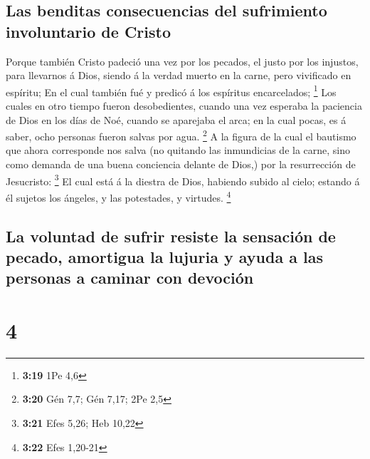 \hypertarget{las-benditas-consecuencias-del-sufrimiento-involuntario-de-cristo}{%
\subsection{Las benditas consecuencias del sufrimiento involuntario de
Cristo}\label{las-benditas-consecuencias-del-sufrimiento-involuntario-de-cristo}}

 Porque también Cristo padeció una vez por los pecados, el
justo por los injustos, para llevarnos á Dios, siendo á la verdad muerto
en la carne, pero vivificado en espíritu;  En el cual
también fué y predicó á los espíritus encarcelados; \footnote{\textbf{3:19}
  1Pe 4,6}  Los cuales en otro tiempo fueron desobedientes,
cuando una vez esperaba la paciencia de Dios en los días de Noé, cuando
se aparejaba el arca; en la cual pocas, es á saber, ocho personas fueron
salvas por agua. \footnote{\textbf{3:20} Gén 7,7; Gén 7,17; 2Pe 2,5}
 A la figura de la cual el bautismo que ahora corresponde
nos salva (no quitando las inmundicias de la carne, sino como demanda de
una buena conciencia delante de Dios,) por la resurrección de
Jesucristo: \footnote{\textbf{3:21} Efes 5,26; Heb 10,22} 
El cual está á la diestra de Dios, habiendo subido al cielo; estando á
él sujetos los ángeles, y las potestades, y virtudes. \footnote{\textbf{3:22}
  Efes 1,20-21}

\hypertarget{la-voluntad-de-sufrir-resiste-la-sensaciuxf3n-de-pecado-amortigua-la-lujuria-y-ayuda-a-las-personas-a-caminar-con-devociuxf3n}{%
\subsection{La voluntad de sufrir resiste la sensación de pecado,
amortigua la lujuria y ayuda a las personas a caminar con
devoción}\label{la-voluntad-de-sufrir-resiste-la-sensaciuxf3n-de-pecado-amortigua-la-lujuria-y-ayuda-a-las-personas-a-caminar-con-devociuxf3n}}

\hypertarget{section-3}{%
\section{4}\label{section-3}}

